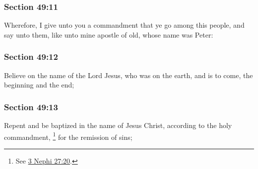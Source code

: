 
	\subsubsection{Section 49:11} %
		\label{DC49-11}

		Wherefore, I give unto you a commandment that ye go among this people, and say unto them, like unto mine apostle of old, whose name was Peter:


	\subsubsection{Section 49:12} %
		\label{DC49-12}

		Believe on the name of the Lord Jesus, who was on the earth, and is to come, the beginning and the end;


	\subsubsection{Section 49:13} %
		\label{DC49-13}

		Repent and be baptized in the name of Jesus Christ, according to the holy commandment,%
			\footnote{%
				See \hyperref[3NEPHI-27-20]{3 Nephi 27:20}.
				}
		for the remission of sins;

